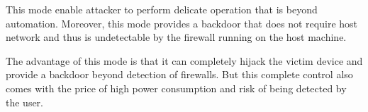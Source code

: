 This mode enable attacker to perform delicate operation that is beyond automation. Moreover, this mode provides a backdoor that does not require host network and thus is undetectable by the firewall running on the host machine.

The advantage of this mode is that it can completely hijack the victim device and provide a backdoor beyond detection of firewalls. But this complete control also comes with the price of high power consumption and risk of being detected by the user.

